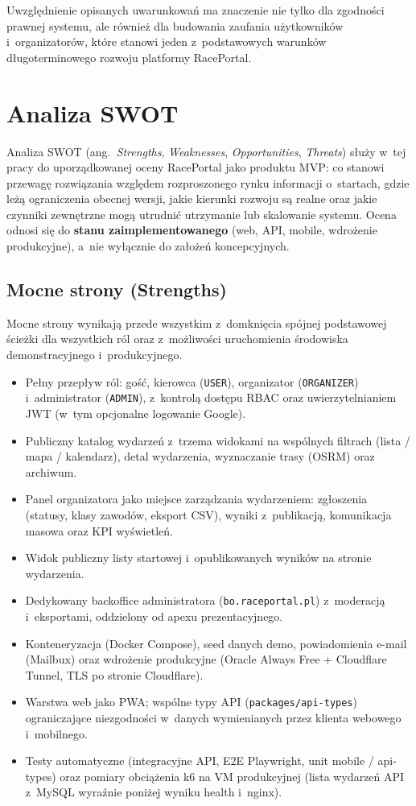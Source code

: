 \documentclass{sprz}
\begin{document}
Uwzględnienie opisanych uwarunkowań ma znaczenie nie tylko dla zgodności prawnej systemu, ale również dla budowania zaufania użytkowników i~organizatorów, które stanowi jeden z~podstawowych warunków długoterminowego rozwoju platformy RacePortal.

\chapter{Analiza SWOT}
\label{ch:swot}
Analiza SWOT (ang.\ \emph{Strengths}, \emph{Weaknesses}, \emph{Opportunities}, \emph{Threats}) służy w~tej pracy do uporządkowanej oceny RacePortal jako produktu MVP: co stanowi przewagę rozwiązania względem rozproszonego rynku informacji o~startach, gdzie leżą ograniczenia obecnej wersji, jakie kierunki rozwoju są realne oraz jakie czynniki zewnętrzne mogą utrudnić utrzymanie lub skalowanie systemu. Ocena odnosi się do \textbf{stanu zaimplementowanego} (web, API, mobile, wdrożenie produkcyjne), a~nie wyłącznie do założeń koncepcyjnych.

\section{Mocne strony (Strengths)}
Mocne strony wynikają przede wszystkim z~domknięcia spójnej podstawowej ścieżki dla wszystkich ról oraz z~możliwości uruchomienia środowiska demonstracyjnego i~produkcyjnego.

\begin{itemize}
  \item Pełny przepływ ról: gość, kierowca (\texttt{USER}), organizator (\texttt{ORGANIZER}) i~administrator (\texttt{ADMIN}), z~kontrolą dostępu RBAC oraz uwierzytelnianiem JWT (w~tym opcjonalne logowanie Google).
  \item Publiczny katalog wydarzeń z~trzema widokami na wspólnych filtrach (lista / mapa / kalendarz), detal wydarzenia, wyznaczanie trasy (OSRM) oraz archiwum.
  \item Panel organizatora jako miejsce zarządzania wydarzeniem: zgłoszenia (statusy, klasy zawodów, eksport CSV), wyniki z~publikacją, komunikacja masowa oraz KPI wyświetleń.
  \item Widok publiczny listy startowej i~opublikowanych wyników na stronie wydarzenia.
  \item Dedykowany backoffice administratora (\texttt{bo.raceportal.pl}) z~moderacją i~eksportami, oddzielony od apexu prezentacyjnego.
  \item Konteneryzacja (Docker Compose), seed danych demo, powiadomienia e-mail (Mailbux) oraz wdrożenie produkcyjne (Oracle Always Free + Cloudflare Tunnel, TLS po stronie Cloudflare).
  \item Warstwa web jako PWA; wspólne typy API (\texttt{packages/api-types}) ograniczające niezgodności w~danych wymienianych przez klienta webowego i~mobilnego.
  \item Testy automatyczne (integracyjne API, E2E Playwright, unit mobile / api-types) oraz pomiary obciążenia k6 na VM produkcyjnej (lista wydarzeń API z~MySQL wyraźnie poniżej wyniku health i~nginx).
\end{itemize}
\end{document}
